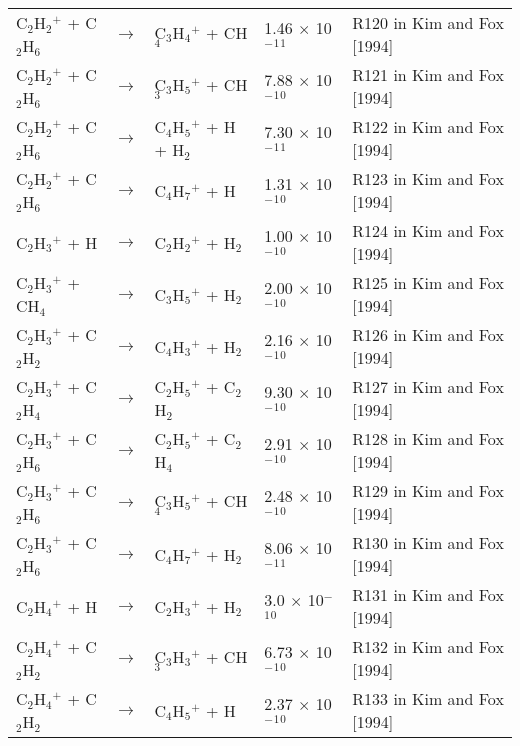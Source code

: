 \documentclass[10pt,a4paper]{jarticle}
\begin{document}
\begin{table}[htb]
{\begin{tabular}{lclll}
 C$_2$H$_2$$^+$ + C$_2$H$_6$     & $\rightarrow$ & C$_3$H$_4$$^+$ + CH$_4$           & 1.46 $\times$ 10$^-$$^1$$^1$ & R120 in Kim and Fox [1994] \\
 C$_2$H$_2$$^+$ + C$_2$H$_6$     & $\rightarrow$ & C$_3$H$_5$$^+$ + CH$_3$           & 7.88 $\times$ 10$^-$$^1$$^0$ & R121 in Kim and Fox [1994] \\
 C$_2$H$_2$$^+$ + C$_2$H$_6$     & $\rightarrow$ & C$_4$H$_5$$^+$ + H   +  H$_2$     & 7.30 $\times$ 10$^-$$^1$$^1$ & R122 in Kim and Fox [1994] \\
 C$_2$H$_2$$^+$ + C$_2$H$_6$     & $\rightarrow$ & C$_4$H$_7$$^+$ + H             & 1.31 $\times$ 10$^-$$^1$$^0$ & R123 in Kim and Fox [1994] \\
 C$_2$H$_3$$^+$ + H        & $\rightarrow$ & C$_2$H$_2$$^+$ + H$_2$            & 1.00 $\times$ 10$^-$$^1$$^0$ & R124 in Kim and Fox [1994] \\
 C$_2$H$_3$$^+$ + CH$_4$      & $\rightarrow$ & C$_3$H$_5$$^+$ + H$_2$            & 2.00 $\times$ 10$^-$$^1$$^0$ & R125 in Kim and Fox [1994] \\
 C$_2$H$_3$$^+$ + C$_2$H$_2$     & $\rightarrow$ & C$_4$H$_3$$^+$ + H$_2$            & 2.16 $\times$ 10$^-$$^1$$^0$ & R126 in Kim and Fox [1994] \\
 C$_2$H$_3$$^+$ + C$_2$H$_4$     & $\rightarrow$ & C$_2$H$_5$$^+$ + C$_2$H$_2$          & 9.30 $\times$ 10$^-$$^1$$^0$ & R127 in Kim and Fox [1994] \\
 C$_2$H$_3$$^+$ + C$_2$H$_6$     & $\rightarrow$ & C$_2$H$_5$$^+$ + C$_2$H$_4$          & 2.91 $\times$ 10$^-$$^1$$^0$ & R128 in Kim and Fox [1994] \\
 C$_2$H$_3$$^+$ + C$_2$H$_6$     & $\rightarrow$ & C$_3$H$_5$$^+$ + CH$_4$           & 2.48 $\times$ 10$^-$$^1$$^0$ & R129 in Kim and Fox [1994] \\
 C$_2$H$_3$$^+$ + C$_2$H$_6$     & $\rightarrow$ & C$_4$H$_7$$^+$ + H$_2$            & 8.06 $\times$ 10$^-$$^1$$^1$ & R130 in Kim and Fox [1994] \\
 C$_2$H$_4$$^+$ + H        & $\rightarrow$ & C$_2$H$_3$$^+$ + H$_2$            & 3.0 $\times$ 10$^-$$^1$$^0$ & R131 in Kim and Fox [1994] \\
 C$_2$H$_4$$^+$ + C$_2$H$_2$     & $\rightarrow$ & C$_3$H$_3$$^+$ + CH$_3$           & 6.73 $\times$ 10$^-$$^1$$^0$ & R132 in Kim and Fox [1994] \\
 C$_2$H$_4$$^+$ + C$_2$H$_2$     & $\rightarrow$ & C$_4$H$_5$$^+$ + H             & 2.37 $\times$ 10$^-$$^1$$^0$ & R133 in Kim and Fox [1994] \\

\end{tabular}}
\end{table}
\end{document}

